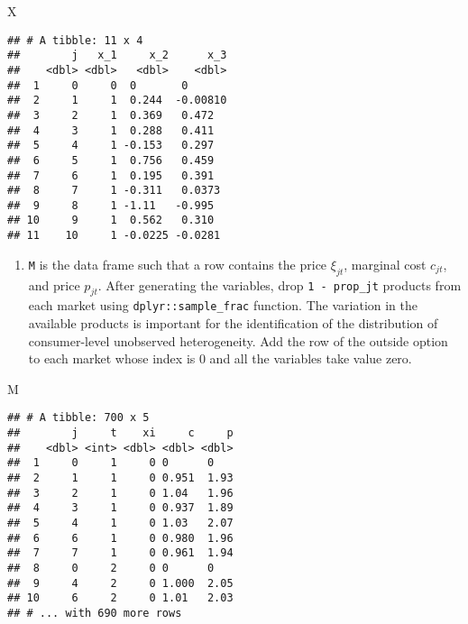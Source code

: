 \documentclass[
]{book}
\newenvironment{Shaded}{\begin{snugshade}}{\end{snugshade}}
\newcommand{\NormalTok}[1]{#1}
\providecommand{\tightlist}{%
  \setlength{\itemsep}{0pt}\setlength{\parskip}{0pt}}
\begin{document}
\begin{Shaded}
\begin{Highlighting}[]
\NormalTok{X}
\end{Highlighting}
\end{Shaded}

\begin{verbatim}
## # A tibble: 11 x 4
##        j   x_1     x_2      x_3
##    <dbl> <dbl>   <dbl>    <dbl>
##  1     0     0  0       0      
##  2     1     1  0.244  -0.00810
##  3     2     1  0.369   0.472  
##  4     3     1  0.288   0.411  
##  5     4     1 -0.153   0.297  
##  6     5     1  0.756   0.459  
##  7     6     1  0.195   0.391  
##  8     7     1 -0.311   0.0373 
##  9     8     1 -1.11   -0.995  
## 10     9     1  0.562   0.310  
## 11    10     1 -0.0225 -0.0281
\end{verbatim}

\begin{enumerate}
\def\labelenumi{\arabic{enumi}.}
\setcounter{enumi}{2}
\tightlist
\item
  \texttt{M} is the data frame such that a row contains the price \(\xi_{jt}\), marginal cost \(c_{jt}\), and price \(p_{jt}\). After generating the variables, drop \texttt{1\ -\ prop\_jt} products from each market using \texttt{dplyr::sample\_frac} function. The variation in the available products is important for the identification of the distribution of consumer-level unobserved heterogeneity. Add the row of the outside option to each market whose index is \(0\) and all the variables take value zero.
\end{enumerate}

\begin{Shaded}
\begin{Highlighting}[]
\NormalTok{M}
\end{Highlighting}
\end{Shaded}

\begin{verbatim}
## # A tibble: 700 x 5
##        j     t    xi     c     p
##    <dbl> <int> <dbl> <dbl> <dbl>
##  1     0     1     0 0      0   
##  2     1     1     0 0.951  1.93
##  3     2     1     0 1.04   1.96
##  4     3     1     0 0.937  1.89
##  5     4     1     0 1.03   2.07
##  6     6     1     0 0.980  1.96
##  7     7     1     0 0.961  1.94
##  8     0     2     0 0      0   
##  9     4     2     0 1.000  2.05
## 10     6     2     0 1.01   2.03
## # ... with 690 more rows
\end{verbatim}
\end{document}
